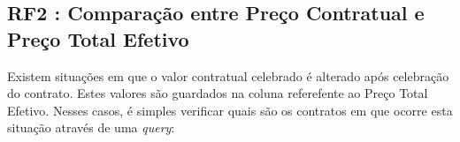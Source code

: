 %



\subsection{RF2 : Comparação entre Preço Contratual e Preço Total Efetivo}

Existem situações em que o valor contratual celebrado é alterado após celebração do contrato. Estes valores são guardados na coluna referefente ao Preço Total Efetivo. Nesses casos, é simples verificar quais são os contratos em que ocorre esta situação através de uma \textit{query}: 



